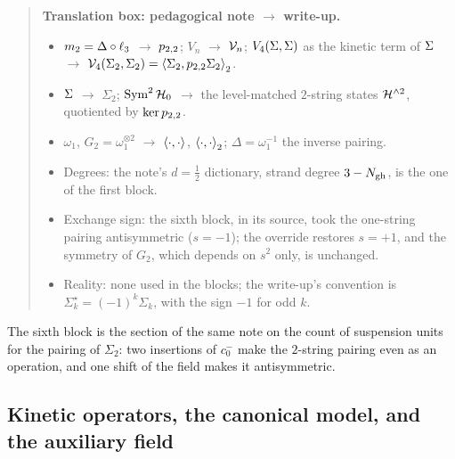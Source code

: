 \begin{quote}
  \small
  \textbf{Translation box: pedagogical note $\to$ write-up.}
  \begin{itemize}
    \setlength{\itemsep}{0.3ex}
    \item $\mtwo = \Delta \circ \ell_3$ $\to$ $\sprod{2}{2}$; $V_n$ $\to$ $\vertex{n}$; $V_4(\Sig, \Sig)$ as the kinetic term of $\Sig$ $\to$ $\vertex{4}(\Sigma_2, \Sigma_2) = \pair[2]{\Sigma_2}{\sprod{2}{2} \Sigma_2}$.
    \item $\Sig$ $\to$ $\Sigma_2$; $\Sym^2 \Hilb_0$ $\to$ the level-matched $2$-string states $\Hn{2}$, quotiented by $\ker \sprod{2}{2}$.
    \item $\omega_1$, $G_2 = \omega_1^{\otimes 2}$ $\to$ $\pair{\cdot}{\cdot}$, $\pair[2]{\cdot}{\cdot}$; $\Delta = \omega_1^{-1}$ the inverse pairing.
    \item Degrees: the note's $d = \tfrac{1}{2}$ dictionary, strand degree $3 - \Ngh$, is the one of the first block.
    \item Exchange sign: the sixth block, in its source, took the one-string pairing antisymmetric ($s = -1$); the override restores $s = + 1$, and the symmetry of $G_2$, which depends on $s^2$ only, is unchanged.
    \item Reality: none used in the blocks; the write-up's convention is $\Sigma_k^\star = (-1)^k \Sigma_k$, with the sign $-1$ for odd $k$.
  \end{itemize}
\end{quote}



\medskip
The sixth block is the section of the same note on the count of suspension units for the pairing of $\Sigma_2$: two insertions of $c_0^-$ make the $2$-string pairing even as an operation, and one shift of the field makes it antisymmetric.



\subsection{Kinetic operators, the canonical model, and the auxiliary field}
\label{ch11:sec:transfer}

